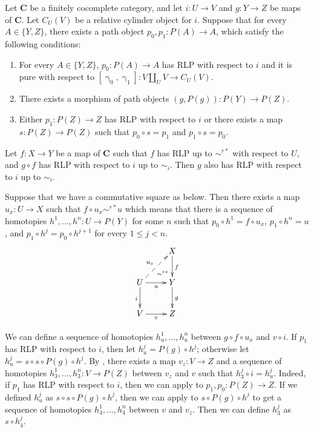 \documentclass{tac}
\theoremstyle{definition}
\newcommand{\cat}[1]{\mathbf{#1}}
\newcommand{\C}{\cat{C}}
\newcommand{\cyli}{\upgamma}
\begin{document}
\begin{lem}[we-bot]
Let $\C$ be a finitely cocomplete category, and let $i : U \to V$ and $g : Y \to Z$ be maps of $\C$.
Let $C_U(V)$ be a relative cylinder object for $i$.
Suppose that for every $A \in \{ Y, Z \}$, there exists a path object $p_0,p_1 : P(A) \to A$, which satisfy the following conditions:
\begin{enumerate}
\item For every $A \in \{ Y, Z \}$, $p_0 : P(A) \to A$ has RLP with respect to $i$ and it is pure with respect to $[\cyli_0,\cyli_1] : V \amalg_U V \to C_U(V)$.
\item There exists a morphism of path objects $(g,P(g)) : P(Y) \to P(Z)$.
\item Either $p_1 : P(Z) \to Z$ has RLP with respect to $i$ or there exists a map $s : P(Z) \to P(Z)$ such that $p_0 \circ s = p_1$ and $p_1 \circ s = p_0$.
\end{enumerate}

Let $f : X \to Y$ be a map of $\C$ such that $f$ has RLP up to $\sim^{r*}$ with respect to $U$, and $g \circ f$ has RLP with respect to $i$ up to $\sim_i$.
Then $g$ also has RLP with respect to $i$ up to $\sim_i$.
\end{lem}
\proof
Suppose that we have a commutative square as below.
Then there exists a map $u_x : U \to X$ such that $f \circ u_x \sim^{r*} u$ which means that there is a sequence of homotopies $h^1, \ldots, h^n : U \to P(Y)$ for some $n$
such that $p_0 \circ h^1 = f \circ u_x$, $p_1 \circ h^n = u$, and $p_1 \circ h^j = p_0 \circ h^{j+1}$ for every $1 \leq j < n$.
\[ \xymatrix{   \ar@{}[dr]|(.7){\sim^{r*}}            & X \ar[d]^f \\
              U \ar@{-->}[ur]^{u_x} \ar[d]_i \ar[r]_u & Y \ar[d]^g \\
              V \ar[r]_v                              & Z
            } \]

We can define a sequence of homotopies $h^1_u, \ldots, h^n_u$ between $g \circ f \circ u_x$ and $v \circ i$.
If $p_1$ has RLP with respect to $i$, then let $h^j_u = P(g) \circ h^j$; otherwise let $h^j_u = s \circ s \circ P(g) \circ h^j$.
By , there exists a map $v_z : V \to Z$ and a sequence of homotopies $h^1_3, \ldots, h^n_3 : V \to P(Z)$ between $v_z$ and $v$ such that $h^j_3 \circ i = h^j_u$.
Indeed, if $p_1$ has RLP with respect to $i$, then we can apply  to $p_1,p_0 : P(Z) \to Z$.
If we defined $h^j_u$ as $s \circ s \circ P(g) \circ h^j$, then we can apply  to $s \circ P(g) \circ h^j$ to get a sequence of homotopies $h^1_4, \ldots, h^n_4$ between $v$ and $v_z$.
Then we can define $h^j_3$ as $s \circ h^j_4$.
\end{document}
